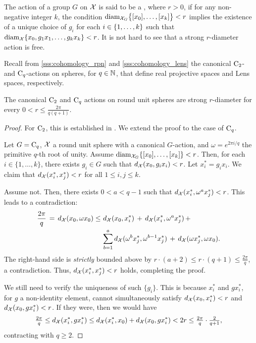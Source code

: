 \subsubsection{}\label{sss:strong_r_action}

The action of a group $G$ on $\cX$ is said to be a , where $r > 0$, if for any non-negative integer $k$, the condition $\diam_{\cX_G}\set[\big]{[x_0],\dots,[x_k]} < r$ implies the existence of a unique choice of $g_i$ for each $i \in \set{1,\dots,k}$ such that $\diam_{\cX}\set{x_0, g_1x_1, \dots, g_kx_k} < r$.
It is not hard to see that a strong $r$-diameter action is free.

Recall from \cref{sss:cohomology_rpn} and \cref{sss:cohomology_lens} the canonical $\rC_2$- and $\rC_q$-actions on spheres, for $q \in \N$, that define real projective spaces and Lens spaces, respectively.

\medskip\lemma
The canonical $\rC_2$ and $\rC_q$ actions on round unit spheres are strong $r$-diameter for every $0 < r \leq \tfrac{2\pi}{q(q+1)}$.

\begin{proof}
    For $\rC_2$, this is established in \cite[Cor.~4.3]{adams2022metric}. We extend the proof to the case of $\rC_q$.

    Let $G = \rC_q$, $\cX$ a round unit sphere with a canonical $G$-action, and $\omega = e^{2\pi i/q}$ the primitive $q$-th root of unity. Assume $\diam_{\cX_G}\{[x_0], \dots, [x_k]\} < r$. Then, for each $i \in \{1, \dots, k\}$, there exists $g_i \in G$ such that $d_{\cX}(x_0, g_i x_i) < r$. Let $x_i^* = g_i x_i$. We claim that $d_{\cX}(x_i^*, x_j^*) < r$ for all $1 \leq i, j \leq k$.

    Assume not. Then, there exists $0 < a < q-1$ such that $d_{\cX}(x_i^*, \omega^a x_j^*) < r$. This leads to a contradiction:
    \begin{align*}
    \frac{2\pi}{q} \,=\, d_{\cX}(x_0, \omega x_0) \leq\, & \, d_{\cX}(x_0, x_i^*) \, + \, d_{\cX}(x_i^*, \omega^a x_j^*) \, + \, \\
    & \sum_{b=1}^a d_{\cX}(\omega^b x_j^*, \omega^{b-1} x_j^*) \, + \, d_{\cX}(\omega x_j^*, \omega x_0).
    \end{align*}
    The right-hand side is \emph{strictly} bounded above by $r \cdot (a + 2) \leq r \cdot (q + 1) \leq \frac{2\pi}{q}$, a contradiction. Thus, $d_{\cX}(x_i^*, x_j^*) < r$ holds, completing the proof.

    We still need to verify the uniqueness of such $\{g_i\}$.
    This is because %
    $x_i^*$ and $gx_i^*$, for $g$ a non-identity element, cannot simultaneously satisfy $d_{\cX}(x_0, x_i^*) < r$ and $d_{\cX}(x_0, gx_i^*) < r$.
    If they were, then we would have 
    \[\tfrac{2\pi}{q} \leq d_{\cX}(x_i^*, gx_i^*) \leq d_{\cX}(x_i^*, x_0) + d_{\cX}(x_0, gx_i^*) < 2r \leq \tfrac{2\pi}{q} \cdot \tfrac{2}{q+1}, 
    \]
    contracting with $q \geq 2$.
\end{proof}

